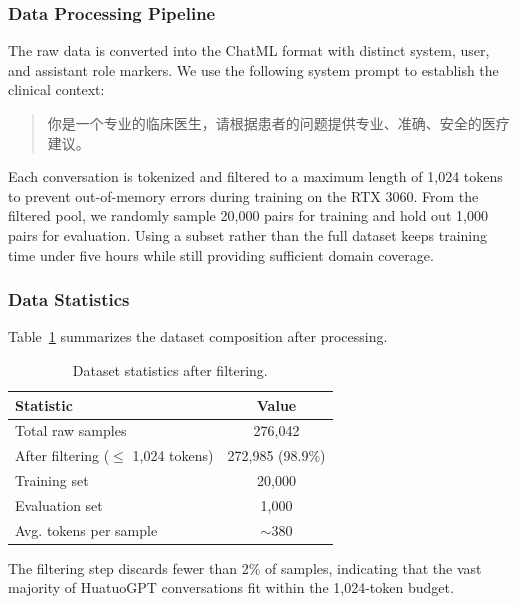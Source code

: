 \documentclass[12pt,a4paper]{article}
\begin{document}
\subsubsection{Data Processing Pipeline}

The raw data is converted into the ChatML format with distinct system, user, and assistant role markers. We use the following system prompt to establish the clinical context:

\begin{quote}
  你是一个专业的临床医生，请根据患者的问题提供专业、准确、安全的医疗建议。
\end{quote}

Each conversation is tokenized and filtered to a maximum length of 1,024 tokens to prevent out-of-memory errors during training on the RTX 3060. From the filtered pool, we randomly sample 20,000 pairs for training and hold out 1,000 pairs for evaluation. Using a subset rather than the full dataset keeps training time under five hours while still providing sufficient domain coverage.

\subsubsection{Data Statistics}

Table~\ref{tab:data_stats} summarizes the dataset composition after processing.

\begin{table}[ht]
\centering
\caption{Dataset statistics after filtering.}
\label{tab:data_stats}
\begin{tabular}{lc}
\toprule
\textbf{Statistic} & \textbf{Value} \\
\midrule
Total raw samples & 276,042 \\
After filtering ($\leq$ 1,024 tokens) & 272,985 (98.9\%) \\
Training set & 20,000 \\
Evaluation set & 1,000 \\
Avg. tokens per sample & $\sim$380 \\
\bottomrule
\end{tabular}
\end{table}

The filtering step discards fewer than 2\% of samples, indicating that the vast majority of HuatuoGPT conversations fit within the 1,024-token budget.

\end{document}
